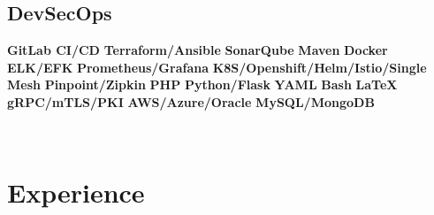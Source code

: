 \documentclass[]{friggeri-cv}
\begin{document}
\begin{aside}
  \section{DevSecOps}
    \textbf{GitLab CI/CD}
    \textbf{Terraform/Ansible}
    \textbf{SonarQube}
    \textbf{Maven}
    \textbf{Docker}
    \textbf{ELK/EFK}
    \textbf{Prometheus/Grafana}
    \textbf{K8S/Openshift/Helm/Istio/Single Mesh}
    \textbf{Pinpoint/Zipkin}
    \textbf{PHP}
    \textbf{Python/Flask}
    \textbf{YAML}
    \textbf{Bash}
    \textbf{LaTeX}
    \textbf{gRPC/mTLS/PKI}
    \textbf{AWS/Azure/Oracle}
    \textbf{MySQL/MongoDB}
    ~
\end{aside}
~

\section{Experience}
\end{document}
